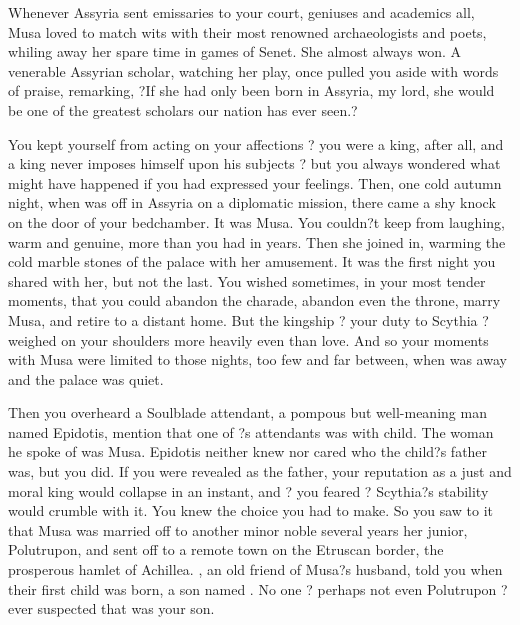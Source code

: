 \documentclass[char]{Kos}
\begin{document}
    Whenever Assyria sent emissaries to your court, geniuses and academics all, Musa loved to match wits with their most renowned archaeologists and poets, whiling away her spare time in games of Senet. She almost always won. A venerable Assyrian scholar, watching her play, once pulled you aside with words of praise, remarking, ?If she had only been born in Assyria, my lord, she would be one of the greatest scholars our nation has ever seen.?

    You kept yourself from acting on your affections ? you were a king, after all, and a king never imposes himself upon his subjects ? but you always wondered what might have happened if you had expressed your feelings. Then, one cold autumn night, when \cScythiaQueen{} was off in Assyria on a diplomatic mission, there came a shy knock on the door of your bedchamber. It was Musa. You couldn?t keep from laughing, warm and genuine, more than you had in years. Then she joined in, warming the cold marble stones of the palace with her amusement. It was the first night you shared with her, but not the last. You wished sometimes, in your most tender moments, that you could abandon the charade, abandon even the throne, marry Musa, and retire to a distant home. But the kingship ? your duty to Scythia ? weighed on your shoulders more heavily even than love. And so your moments with Musa were limited to those nights, too few and far between, when \cScythiaQueen{} was away and the palace was quiet.

    Then you overheard a Soulblade attendant, a pompous but well-meaning man named Epidotis, mention that one of \cScythiaQueen{}?s attendants was with child. The woman he spoke of was Musa. Epidotis neither knew nor cared who the child?s father was, but you did. If you were revealed as the father, your reputation as a just and moral king would collapse in an instant, and ? you feared ? Scythia?s stability would crumble with it. You knew the choice you had to make. So you saw to it that Musa was married off to another minor noble several years her junior, Polutrupon, and sent off to a remote town on the Etruscan border, the prosperous hamlet of Achillea. \cScythiaQueen{}, an old friend of Musa?s husband, told you when their first child was born, a son named \cWard{}. No one ? perhaps not even Polutrupon ? ever suspected that \cWard{} was your son.
\end{document}
